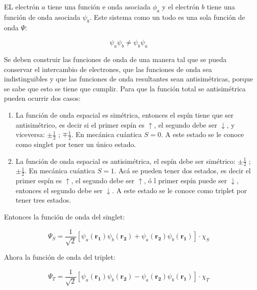 \documentclass[11pt,fleqn]{book}
\renewcommand{\vec}[1]{\mathbf{#1}}
\begin{document}

EL electrón $a$ tiene una función e onda asociada $\phi_{a}$ y el electrón $b$ tiene una función de onda asociada $\psi_{b}$. Este sistema como un todo es una sola función de onda $\Psi$:

\begin{equation*}
    \psi_{a}\psi_{b}\neq\psi_{b}\psi_{a}
\end{equation*}

Se deben construir las funciones de onda de una manera tal que se pueda conservar el intercambio de electrones, que las funciones de onda sea indistinguibles y que las funciones de onda resultantes sean antisimétricas, porque se sabe que esto se tiene que cumplir. Para que la función total se antisimétrica pueden ocurrir dos casos:

\begin{enumerate}
    \item La función de onda espacial es simétrica, entonces el espín tiene que ser antisimétrico, es decir si el primer espín es $\uparrow$, el segundo debe ser $\downarrow$, y viceversa: $\pm\frac{1}{2}$ ; $\mp\frac{1}{2}$. En mecánica cuántica $S=0$. A este estado se le conoce como singlet por tener un único estado.
    
    \item La función de onda espacial es antisimétrica, el espín debe ser simétrico: $\pm\frac{1}{2}$ ; $\pm\frac{1}{2}$. En mecánica cuántica $S=1$. Acá se pueden tener dos estados, es decir el primer espín es $\uparrow$, el segundo debe ser $\uparrow$, ó l primer espín puede ser $\downarrow$, entonces el segundo debe ser $\downarrow$. A este estado se le conoce como triplet por tener tres estados.
\end{enumerate}


Entonces la función de onda del singlet:

\begin{equation}
    \Psi_{S}=\frac{1}{\sqrt{2}}\left[\psi_{a}(\vec{r_{1}})\psi_{b}(\vec{r_{2}})+\psi_{a}(\vec{r_{2}})\psi_{b}(\vec{r_{1}})\right]\cdot\chi_{S}
    \label{Eq. 5.2}
\end{equation}

Ahora la función de onda del triplet:

\begin{equation}
    \Psi_{T}=\frac{1}{\sqrt{2}}\left[\psi_{a}(\vec{r_{1}})\psi_{b}(\vec{r_{2}})-\psi_{a}(\vec{r_{2}})\psi_{b}(\vec{r_{1}})\right]\cdot\chi_{T}
    \label{Eq. 5.3}
\end{equation}
\end{document}

